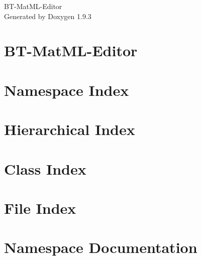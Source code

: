 \documentclass[twoside]{book}
\newcommand{\+}{\discretionary{\mbox{\scriptsize$\hookleftarrow$}}{}{}}
\newcommand{\clearemptydoublepage}{%
    \newpage{\pagestyle{empty}\cleardoublepage}%
  }
\begin{document}
  \raggedbottom
    \hypersetup{pageanchor=false,
                bookmarksnumbered=true,
                pdfencoding=unicode
               }
  \begin{titlepage}
  \vspace*{7cm}
  \begin{center}%
  {\Large BT-\/\+Mat\+ML-\/\+Editor}\\
  \vspace*{1cm}
  {\large Generated by Doxygen 1.9.3}\\
  \end{center}
  \end{titlepage}
  \clearemptydoublepage
  \tableofcontents
  \clearemptydoublepage
  \hypersetup{pageanchor=true}
\chapter{BT-\/\+Mat\+ML-\/\+Editor}
\label{index}\hypertarget{index}{}
\chapter{Namespace Index}

\chapter{Hierarchical Index}

\chapter{Class Index}

\chapter{File Index}

\chapter{Namespace Documentation}

\end{document}
